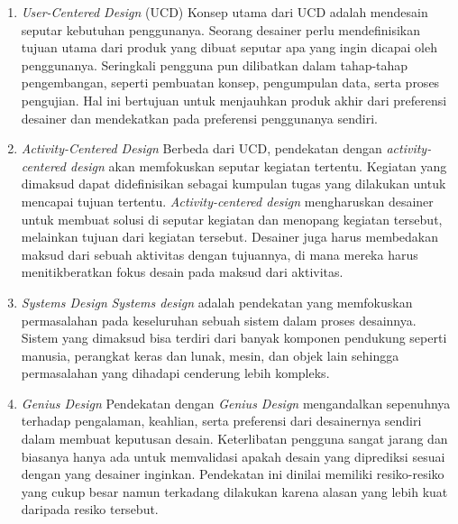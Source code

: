 \begin{enumerate}
  \item \textit{User-Centered Design} (UCD)
  \subitem Konsep utama dari UCD adalah mendesain seputar kebutuhan penggunanya. Seorang desainer perlu mendefinisikan tujuan utama dari produk yang dibuat seputar apa yang ingin dicapai oleh penggunanya. Seringkali pengguna pun dilibatkan dalam tahap-tahap pengembangan, seperti pembuatan konsep, pengumpulan data, serta proses pengujian. Hal ini bertujuan untuk menjauhkan produk akhir dari preferensi desainer dan mendekatkan pada preferensi penggunanya sendiri.
   
  \item \textit{Activity-Centered Design}
  \subitem Berbeda dari UCD, pendekatan dengan \textit{activity-centered design} akan memfokuskan seputar kegiatan tertentu. Kegiatan yang dimaksud dapat didefinisikan sebagai kumpulan tugas yang dilakukan untuk mencapai tujuan tertentu. \textit{Activity-centered design} mengharuskan desainer untuk membuat solusi di seputar kegiatan dan menopang kegiatan tersebut, melainkan tujuan dari kegiatan tersebut. Desainer juga harus membedakan maksud dari sebuah aktivitas dengan tujuannya, di mana mereka harus menitikberatkan fokus desain pada maksud dari aktivitas.
 
  \item \textit{Systems Design}
  \subitem \textit{Systems design} adalah pendekatan yang memfokuskan permasalahan pada keseluruhan sebuah sistem dalam proses desainnya. Sistem yang dimaksud bisa terdiri dari banyak komponen pendukung seperti manusia, perangkat keras dan lunak, mesin, dan objek lain sehingga permasalahan yang dihadapi cenderung lebih kompleks.
 
  \item \textit{Genius Design}
  \subitem Pendekatan dengan \textit{Genius Design} mengandalkan sepenuhnya terhadap pengalaman, keahlian, serta preferensi dari desainernya sendiri dalam membuat keputusan desain. Keterlibatan pengguna sangat jarang dan biasanya hanya ada untuk memvalidasi apakah desain yang diprediksi sesuai dengan yang desainer inginkan. Pendekatan ini dinilai memiliki resiko-resiko yang cukup besar namun terkadang dilakukan karena alasan yang lebih kuat daripada resiko tersebut.
 
\end{enumerate}

